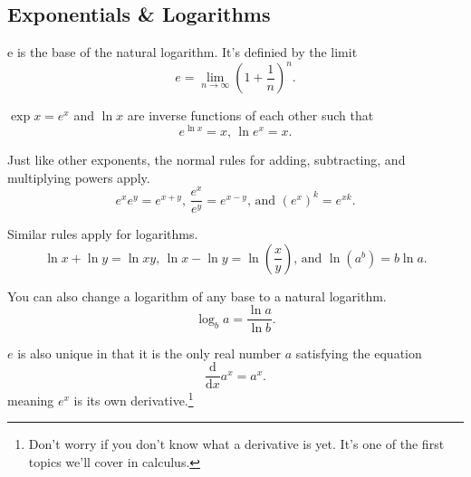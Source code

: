 \subsection{Exponentials \& Logarithms}
\begin{definition}
	e is the base of the natural logarithm. It's definied by the limit
	\begin{equation*}
		e = \lim\limits_{n\rightarrow\infty}{\left(1+\frac{1}{n}\right)^n}.
	\end{equation*}
\end{definition}

\noindent
$\exp{x} = e^x$ and $\ln{x}$ are inverse functions of each other such that
\begin{equation*}
	e^{\ln{x}} = x \text{, } \ln{e^x} = x.
\end{equation*}

\noindent
Just like other exponents, the normal rules for adding, subtracting, and multiplying powers apply.
\begin{equation*}
	e^xe^y = e^{x+y}\text{, }\frac{e^x}{e^y}=e^{x-y}\text{, and }\left(e^x\right)^k=e^{xk}.
\end{equation*}

\noindent
Similar rules apply for logarithms.
\begin{equation*}
	\ln{x}+\ln{y} = \ln{xy}\text{, }\ln{x}-\ln{y} = \ln{\left(\frac{x}{y}\right)}\text{, and }\ln{\left(a^b\right)}=b\ln{a}.
\end{equation*}

\noindent
You can also change a logarithm of any base to a natural logarithm.
\begin{equation*}
	\log_{b}{a} = \frac{\ln{a}}{\ln{b}}.
\end{equation*}

\noindent
$e$ is also unique in that it is the only real number $a$ satisfying the equation
\begin{equation*}
	\frac{\mathrm{d}}{\mathrm{d}x}a^x = a^x.
\end{equation*}
meaning $e^x$ is its own derivative.\footnote{Don't worry if you don't know what a derivative is yet. It's one of the first topics we'll cover in calculus.}